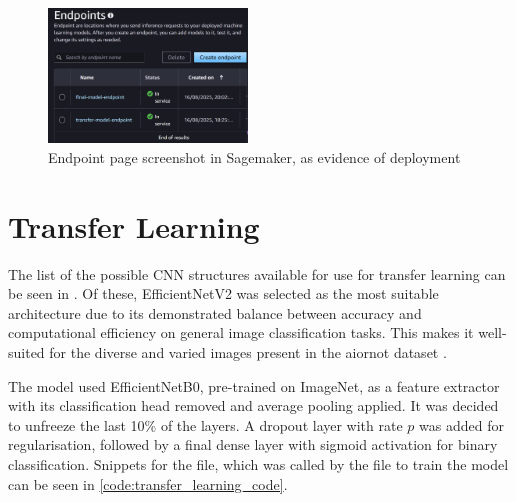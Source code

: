 \begin{figure}[h]
    \centering
    \includegraphics[width=200px]{figures/endpoints_screenshot.png} %
    \centering
    \caption{Endpoint page screenshot in Sagemaker, as evidence of deployment} %
    \label{fig:endpoint} %
\end{figure}

\begin{figure}[h]
        
\end{figure}

\newpage

\section{Transfer Learning} \label{sec:transfer_learning}

The list of the possible CNN structures available for use for transfer learning can be seen in \cite{keras_applications}. Of these, EfficientNetV2 was selected as the most suitable architecture due to its demonstrated balance between accuracy and computational efficiency on general image classification tasks. This makes it well-suited for the diverse and varied images present in the aiornot dataset \cite{keras_applications, tan2021efficientnetv2}.

The model used EfficientNetB0, pre-trained on ImageNet, as a feature extractor with its classification head removed and average pooling applied. It was decided to unfreeze the last 10\% of the layers. A dropout layer with rate $p$ was added for regularisation, followed by a final dense layer with sigmoid activation for binary classification. Snippets for the  file, which was called by the  file to train the model can be seen in \cref{code:transfer_learning_code}.

\begin{figure}[h]
    
    \label{fig:transfer_learning_code}
\end{figure}

